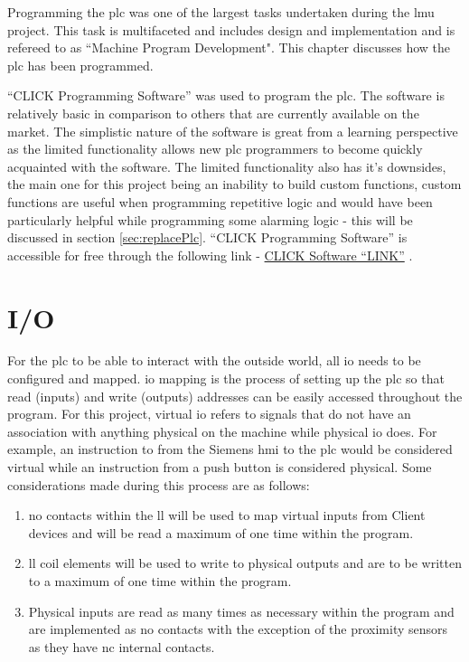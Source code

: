 Programming the \acrshort{plc} was one of the largest tasks undertaken during the \acrshort{lmu} project. This task is multifaceted and includes design and implementation and is refereed to as ``Machine Program Development". This chapter discusses how the \acrshort{plc} has been programmed.

``CLICK Programming Software'' was used to program the \acrshort{plc}. The software is relatively basic in comparison to others that are currently available on the market. The simplistic nature of the software is great from a learning perspective as the limited functionality allows new \acrshort{plc} programmers to become quickly acquainted with the software. The limited functionality also has it's downsides, the main one for this project being an inability to build custom functions, custom functions are useful when programming repetitive logic and would have been particularly helpful while programming some alarming logic - this will be discussed in section \ref{sec:replacePlc}. ``CLICK Programming Software'' is accessible for free through the following link - \href{https://www.automationdirect.com/clickplcs/free-software/free-click-software}{CLICK Software ``LINK''} \cite{clickSoftwareDownload}.

\section{I/O}
    For the \acrshort{plc} to be able to interact with the outside world, all \acrshort{io} needs to be configured and mapped. \acrshort{io} mapping is the process of setting up the \acrshort{plc} so that read (inputs) and write (outputs) addresses can be easily accessed throughout the program. For this project, virtual \acrshort{io} refers to signals that do not have an association with anything physical on the machine while physical \acrshort{io} does. For example, an instruction to from the Siemens \acrshort{hmi} to the \acrshort{plc} would be considered virtual while an instruction from a push button is considered physical. Some considerations made during this process are as follows:
    
    \begin{enumerate}
        \item \acrshort{no} contacts within the \acrshort{ll} will be used to map virtual inputs from Client devices and will be read a maximum of one time within the program.
        \item \acrshort{ll} coil elements will be used to write to physical outputs and are to be written to a maximum of one time within the program. 
        \item Physical inputs are read as many times as necessary within the program and are implemented as \acrshort{no} contacts with the exception of the proximity sensors as they have \acrshort{nc} internal contacts. 
    \end{enumerate}

